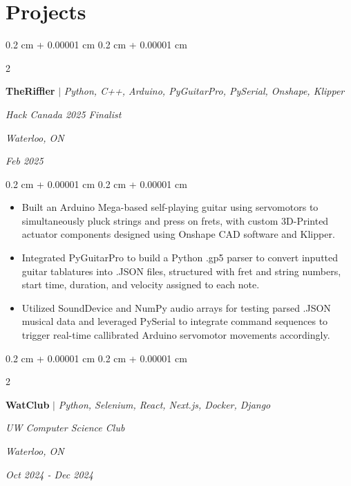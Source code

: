 \documentclass[10pt, letterpaper]{article}
\newenvironment{highlights}{
    \begin{itemize}[
        topsep=0.10 cm,
        parsep=0.10 cm,
        partopsep=0pt,
        itemsep=0pt,
        leftmargin=0.4 cm + 10pt
    ]
}{
    \end{itemize}
} %
\newenvironment{onecolentry}{
    \begin{adjustwidth}{
        0.2 cm + 0.00001 cm
    }{
        0.2 cm + 0.00001 cm
    }
}{
    \end{adjustwidth}
} %
\newenvironment{twocolentry}[2][]{
    \onecolentry
    \def\secondColumn{#2}
    \setcolumnwidth{\fill, 4.5 cm}
    \begin{paracol}{2}
}{
    \switchcolumn \raggedleft \secondColumn
    \end{paracol}
    \endonecolentry
} %
\let\hrefWithoutArrow\href
\renewcommand{\href}[2]{\hrefWithoutArrow{#1}{\ifthenelse{\equal{#2}{}}{ }{#2 }\raisebox{.15ex}{\footnotesize \faExternalLink*}}}
\begin{document}
    \section{Projects}

       \begin{twocolentry}{
         \textit{Waterloo, ON}    
            
        \textit{Feb 2025}}
            \textbf{\textbf{TheRiffler }}\mbox{\hrefWithoutArrow{https://github.com/vinny-nguyen/TheRiffler}{\color{black}{\footnotesize\faGithub}}}
            $|$ \emph{Python, C++, Arduino, PyGuitarPro, PySerial, Onshape, Klipper}
            
            \textit{Hack Canada 2025 Finalist}
        \end{twocolentry}
        
        \vspace{0.10 cm}
        \begin{onecolentry}
            \begin{highlights}
                \item Built an Arduino Mega-based self-playing guitar using servomotors to simultaneously pluck strings and press on frets, with custom 3D-Printed actuator components designed using Onshape CAD software and Klipper.
                \item Integrated PyGuitarPro to build a Python .gp5 parser to convert inputted guitar tablatures into .JSON files, structured with fret and string numbers, start time, duration, and velocity assigned to each note.
                \item Utilized SoundDevice and NumPy audio arrays for testing parsed .JSON musical data and leveraged PySerial to integrate command sequences to trigger real-time callibrated Arduino servomotor movements accordingly.
            \end{highlights}
        \end{onecolentry}

    \vspace{0.2 cm}

\begin{twocolentry}{
        \textit{Waterloo, ON}    
            
        \textit{Oct 2024 - Dec 2024}}
            \textbf{\textbf{WatClub }}\mbox{\hrefWithoutArrow{https://github.com/Brucewang15/WatClub}{\color{black}{\footnotesize\faGithub}}} $|$ \emph{Python, Selenium, React, Next.js, Docker, Django}
            
            \textit{UW Computer Science Club}
        \end{twocolentry}
        
\end{document}
